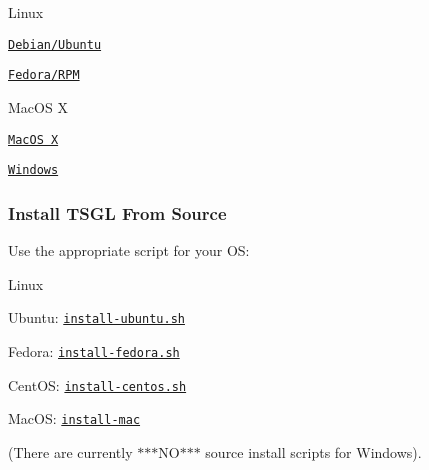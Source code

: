 \begin{DoxyItemize}
\item Linux
\begin{DoxyItemize}
\item \href{https://github.com/Calvin-CS/TSGL/wiki/Debian-%28Aptitude%29}{\tt Debian/\-Ubuntu}
\item \href{https://github.com/Calvin-CS/TSGL/wiki/RPM}{\tt Fedora/\-R\-P\-M}
\end{DoxyItemize}
\item Mac\-O\-S X
\begin{DoxyItemize}
\item \href{https://github.com/Calvin-CS/TSGL/wiki/MacOS-X}{\tt Mac\-O\-S X}
\end{DoxyItemize}
\item \href{https://github.com/Calvin-CS/TSGL/blob/master/readMeWindows.txt}{\tt Windows}
\end{DoxyItemize}

\subsubsection*{Install T\-S\-G\-L From Source}

Use the appropriate script for your O\-S\-:


\begin{DoxyItemize}
\item Linux
\begin{DoxyItemize}
\item Ubuntu\-: \href{https://github.com/Calvin-CS/TSGL/blob/master/install-ubuntu.sh}{\tt install-\/ubuntu.\-sh}
\item Fedora\-: \href{https://github.com/Calvin-CS/TSGL/blob/master/install-fedora.sh}{\tt install-\/fedora.\-sh}
\item Cent\-O\-S\-: \href{https://github.com/Calvin-CS/TSGL/blob/master/install-centos.sh}{\tt install-\/centos.\-sh}
\end{DoxyItemize}
\item Mac\-O\-S\-: \href{https://github.com/Calvin-CS/TSGL/blob/master/install-mac}{\tt install-\/mac}
\end{DoxyItemize}

(There are currently $\ast$$\ast$$\ast$\-N\-O$\ast$$\ast$$\ast$ source install scripts for Windows). 